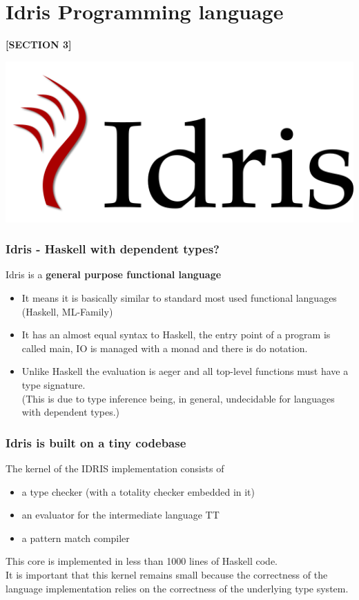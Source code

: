 \section{Idris Programming language}
\begin{frame}
\begin{center}\textbf{[SECTION 3]}\end{center}
\includegraphics[height=.5\textwidth,width=1\textwidth]{img/idris_logo.png}
\end{frame}

\begin{frame}
\frametitle{Idris - Haskell with dependent types?}
Idris is a \textbf{general purpose functional language} \\
\begin{itemize}
\item It means it is basically similar to standard most used functional languages (Haskell, ML-Family)
\item It has an almost equal syntax to Haskell, the entry point of a program is called main,
IO is managed with a monad and there is do notation.
\item Unlike Haskell the evaluation is aeger and all top-level functions must have a type signature.\\ 
(This is due to type inference being, in general, undecidable for languages with dependent types.)
\end{itemize}
\end{frame}


\begin{frame}
\frametitle{Idris is built on a tiny codebase}
The kernel of the IDRIS implementation consists of
\begin{itemize}
	\item a type checker (with a totality checker embedded in it)
	\item an evaluator for the intermediate language TT	
	\item a pattern match compiler
\end{itemize}
This core is implemented in less than 1000 lines of Haskell code.\\
It is important that this kernel remains small because the correctness of the language implementation relies on the correctness of the underlying type system.
\end{frame}


